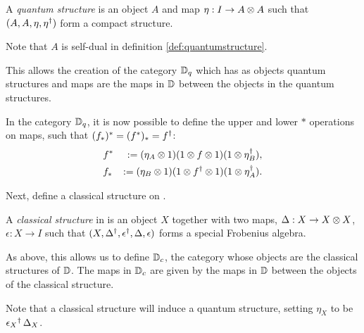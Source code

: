 \begin{definition}\label{def:quantumstructure}
  A \emph{quantum structure} is an object $A$ and map $\eta:I\to A\otimes A$ such that
  $(A,A,\eta,{\eta}^{\dagger})$ form a compact structure.
\end{definition}
Note that $A$ is self-dual in definition \ref{def:quantumstructure}.

This allows the creation of the category $\mathbb{D}_{q}$ which has as objects quantum structures and maps
are the maps in $\mathbb{D}$ between the objects in the quantum structures.

In the category $\mathbb{D}_{q}$, it is now possible to define the upper and lower $*$ operations on maps,
such that $(f_{*})^{*}= (f^{*})_{*} = {f}^{\dagger}$:
\begin{eqnarray*}
&f^{*} &:= (\eta_{A}\otimes1) (1 \otimes f\otimes1) (1\otimes{\eta}^{\dagger}_{B}),\\
&f_{*} &:= (\eta_{B}\otimes1) (1 \otimes {f}^{\dagger}\otimes1) (1\otimes{\eta}^{\dagger}_{A}).
\end{eqnarray*}

Next, define a classical structure on \cD.
\begin{definition}\label{def:classicalstructure}
  A \emph{classical structure} in \cD{} is an object $X$ together with two maps, $\Delta :X \to X\otimes X$,
  $\epsilon:X\to I$ such that $(X,{\Delta}^{\dagger},{\epsilon}^{\dagger},\Delta,\epsilon)$ forms a special
  Frobenius algebra.
\end{definition}

As above, this allows us to define $\mathbb{D}_{c}$, the category whose objects are the classical
structures of $\mathbb{D}$. The maps in $\mathbb{D}_{c}$ are given by the maps in $\mathbb{D}$ between the
objects of the classical structure.

Note that a classical structure will induce a quantum structure, setting $\eta_{X}$ to be
${\epsilon_{X}}^{\dagger}\, \Delta_{X}$.




